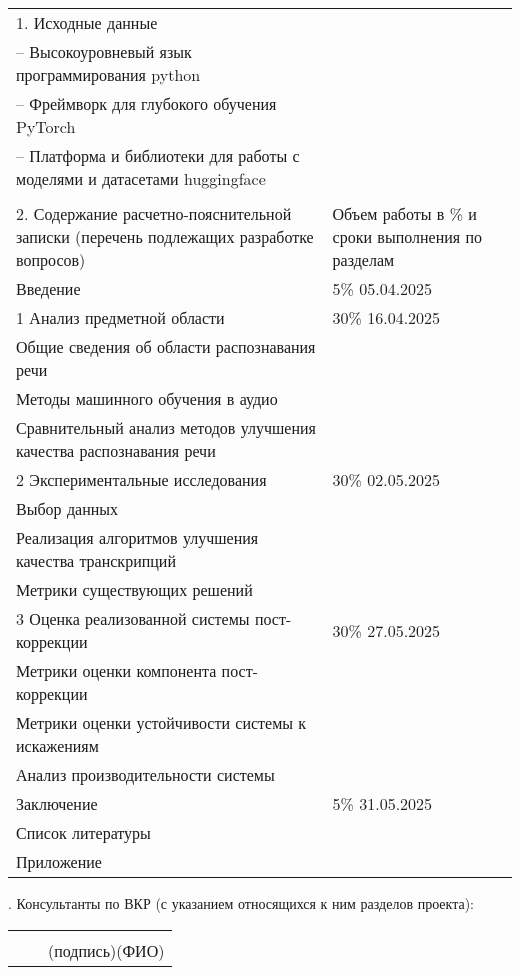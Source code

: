 {\begin{longtable}{p{}|p{}}
1. Исходные данные\\
-- Высокоуровневый язык программирования python \\
-- Фреймворк для глубокого обучения PyTorch\\
-- Платформа и библиотеки для работы с моделями и датасетами huggingface \\
\\
2. Содержание расчетно-пояснительной записки (перечень подлежащих разработке вопросов)
& Объем работы в \% и сроки выполнения по разделам\\
Введение & 5\% \hfill 05.04.2025\\
1 Анализ предметной области & 30\% \hfill 16.04.2025\\
Общие сведения об области распознавания речи\\
Методы машинного обучения в аудио\\
Сравнительный анализ методов улучшения качества распознавания речи \\
2 Экспериментальные исследования & 30\% \hfill 02.05.2025 \\
Выбор данных \\
Реализация алгоритмов улучшения качества транскрипций\\
Метрики существующих решений\\
3 Оценка реализованной системы пост-коррекции & 30\% \hfill 27.05.2025\\
Метрики оценки компонента пост-коррекции\\
Метрики оценки устойчивости системы к искажениям\\
Анализ производительности системы\\
Заключение & 5\% \hfill 31.05.2025\\
Список литературы & \\
Приложение& \\
\end{longtable}

. Консультанты по ВКР (с указанием относящихся к ним разделов проекта):
\vspace{2em}

\noindent
\begin{tabular}{@{}p{}p{}p{}@{}}
 &  & \hrulefill \hspace{2em}\hrulefill\\
 & & \centering\footnotesize (подпись)\hspace{8em}(ФИО)\\
 

\end{tabular}}
